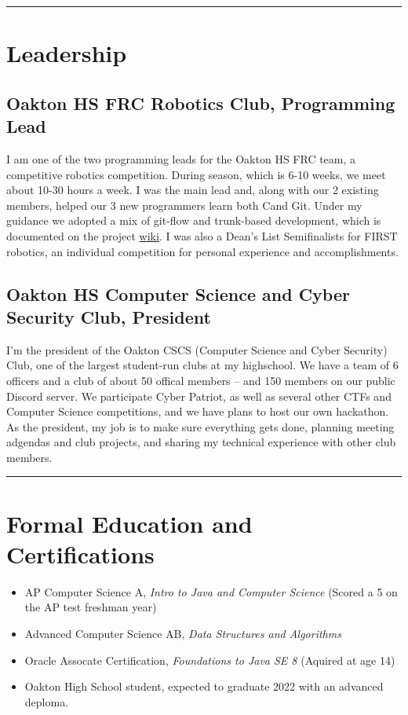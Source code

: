 \documentclass[10pt,letterpaper]{article}
\def\link#1#2{\color{blue!60!black}\href{#1}{#2}\color{black}}
\newcommand{\CPP}
{C\nolinebreak[4]\hspace{-.05em}\raisebox{.35ex}{\footnotesize\bf ++}}
\begin{document}
    \hrule
    \vspace{-0.4em}

    \section*{Leadership}
    \subsection*{Oakton HS FRC Robotics Club, Programming Lead}

    I am one of the two programming leads for the Oakton HS FRC team,
    a competitive robotics competition.
    During season, which is 6-10 weeks, we meet about 10-30 hours a week.
    I was the main lead and, along with our 2 existing members,
    helped our 3 new programmers learn both \CPP and Git.
    Under my guidance we adopted a mix of git-flow and trunk-based development,
    which is documented on the project \link{https://github.com/CougarProgramming623/InfiniteRecharge/wiki/Git}{wiki}.
    I was also a Dean's List Semifinalists for FIRST robotics,
    an individual competition for personal experience and accomplishments.

    \subsection*{Oakton HS Computer Science and Cyber Security Club, President}

    I'm the president of the Oakton CSCS (Computer Science and Cyber Security) Club,
    one of the largest student-run clubs at my highschool. 
    We have a team of 6 officers and a club of about 50 offical members -- and 150 members on our public Discord server.
    We participate Cyber Patriot, as well as several other CTFs and Computer Science competitions,
    and we have plans to host our own hackathon.
    As the president, my job is to make sure everything gets done, planning meeting adgendas and club projects,
    and sharing my technical experience with other club members. 

    \vspace{1em}
    \hrule

    \section*{Formal Education and Certifications}
    \begin{itemize}
        \item AP Computer Science A, \textit{Intro to Java and Computer Science}  (Scored a 5 on the AP test freshman year)
        \item Advanced Computer Science AB, \textit{Data Structures and Algorithms}
        \item Oracle Assocate Certification, \textit{Foundations to Java SE 8} (Aquired at age 14)
        \item Oakton High School student, expected to graduate 2022 with an advanced deploma.
    \end{itemize}
\end{document}
